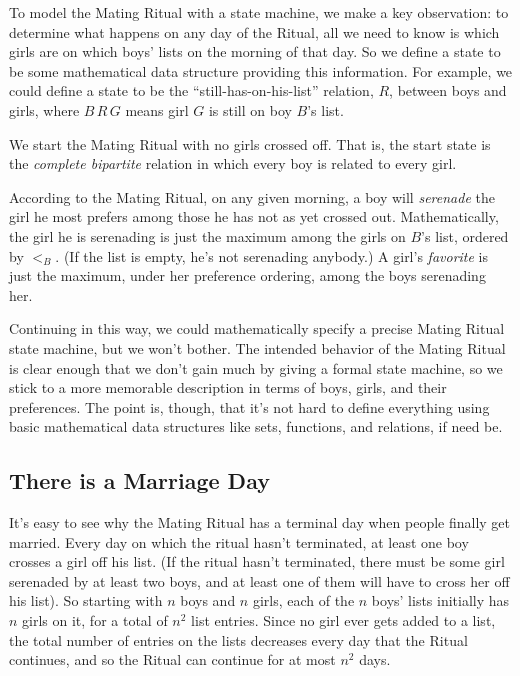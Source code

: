 To model the Mating Ritual with a state machine, we make a key
observation: to determine what happens on any day of the Ritual, all we
need to know is which girls are on which boys' lists on the morning of
that day.  So we define a state to be some mathematical data structure
providing this information.  For example, we could define a state to be
the ``still-has-on-his-list'' relation, $R$, between boys and girls, where
$B\,R\,G$ means girl $G$ is still on boy $B$'s list.

We start the Mating Ritual with no girls crossed off.  That is, the start
state is the \emph{complete bipartite} relation in which every boy is
related to every girl.

According to the Mating Ritual, on any given morning, a boy will
\emph{serenade} the girl he most prefers among those he has not as yet
crossed out.  Mathematically, the girl he is serenading is just the
maximum among the girls on $B$'s list, ordered by $<_B$.  (If the list is
empty, he's not serenading anybody.)  A girl's \emph{favorite} is just the
maximum, under her preference ordering, among the boys serenading her.

Continuing in this way, we could mathematically specify a precise Mating
Ritual state machine, but we won't bother.  The intended behavior of the
Mating Ritual is clear enough that we don't gain much by giving a formal
state machine, so we stick to a more memorable description in terms of
boys, girls, and their preferences.  The point is, though, that it's not
hard to define everything using basic mathematical data structures like
sets, functions, and relations, if need be.

\subsection{There is a Marriage Day}

It's easy to see why the Mating Ritual has a terminal day when people
finally get married.  Every day on which the ritual hasn't terminated, at
least one boy crosses a girl off his list.  (If the ritual hasn't
terminated, there must be some girl serenaded by at least two boys, and at
least one of them will have to cross her off his list).  So starting with
$n$ boys and $n$ girls, each of the $n$ boys' lists initially has $n$
girls on it, for a total of $n^2$ list entries.  Since no girl ever gets
added to a list, the total number of entries on the lists decreases every
day that the Ritual continues, and so the Ritual can continue for at most
$n^2$ days.

